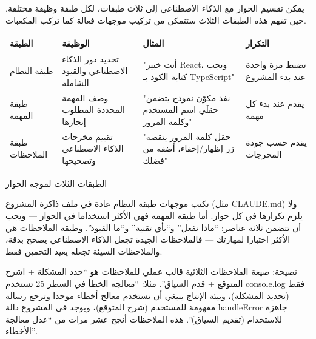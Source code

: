 


يمكن تقسيم الحوار مع الذكاء الاصطناعي إلى ثلاث طبقات، لكل طبقة وظيفة مختلفة. حين تفهم هذه الطبقات الثلاث ستتمكن من تركيب موجهات فعالة كما تركب المكعبات.

\begin{center}
\begin{tabularx}{\linewidth}{|X|X|X|X|}
\hline
\textbf{الطبقة} & \textbf{الوظيفة} & \textbf{المثال} & \textbf{التكرار} \tabularnewline
\hline
طبقة النظام & تحديد دور الذكاء الاصطناعي والقيود الشاملة & "أنت خبير React، ويجب كتابة الكود بـ TypeScript" & تضبط مرة واحدة عند بدء المشروع \tabularnewline
طبقة المهمة & وصف المهمة المحددة المطلوب إنجازها & "نفذ مكوّن نموذج يتضمن حقلَي اسم المستخدم وكلمة المرور" & يقدم عند بدء كل مهمة \tabularnewline
طبقة الملاحظات & تقييم مخرجات الذكاء الاصطناعي وتصحيحها & "حقل كلمة المرور ينقصه زر إظهار/إخفاء، أضفه من فضلك" & يقدم حسب جودة المخرجات \tabularnewline
\hline
\end{tabularx}
\end{center}

\begin{center}\small\color{gray}الطبقات الثلاث لموجه الحوار\end{center}

تكتب موجهات طبقة النظام عادة في ملف ذاكرة المشروع (مثل CLAUDE.md) ولا يلزم تكرارها في كل حوار. أما طبقة المهمة فهي الأكثر استخداما في الحوار — ويجب أن تتضمن ثلاثة عناصر: “ماذا نفعل” و“بأي تقنية” و“ما القيود”. وطبقة الملاحظات هي الأكثر اختبارا لمهارتك — فالملاحظات الجيدة تجعل الذكاء الاصطناعي يصحح بدقة، والملاحظات السيئة تجعله يعيد التخمين فقط.

\begin{tcbinfo}{نصيحة: صيغة الملاحظات الثلاثية}
قالب عملي للملاحظات هو “حدد المشكلة + اشرح المتوقع + قدم السياق”. مثلا: “معالجة الخطأ في السطر 25 تستخدم console.log فقط (تحديد المشكلة)، وبيئة الإنتاج ينبغي أن تستخدم معالج أخطاء موحدا وترجع رسالة مفهومة للمستخدم (شرح المتوقع)، ويوجد في المشروع دالة handleError جاهزة للاستخدام (تقديم السياق)”. هذه الملاحظات أنجح عشر مرات من “عدل معالجة الأخطاء”.

\end{tcbinfo}

